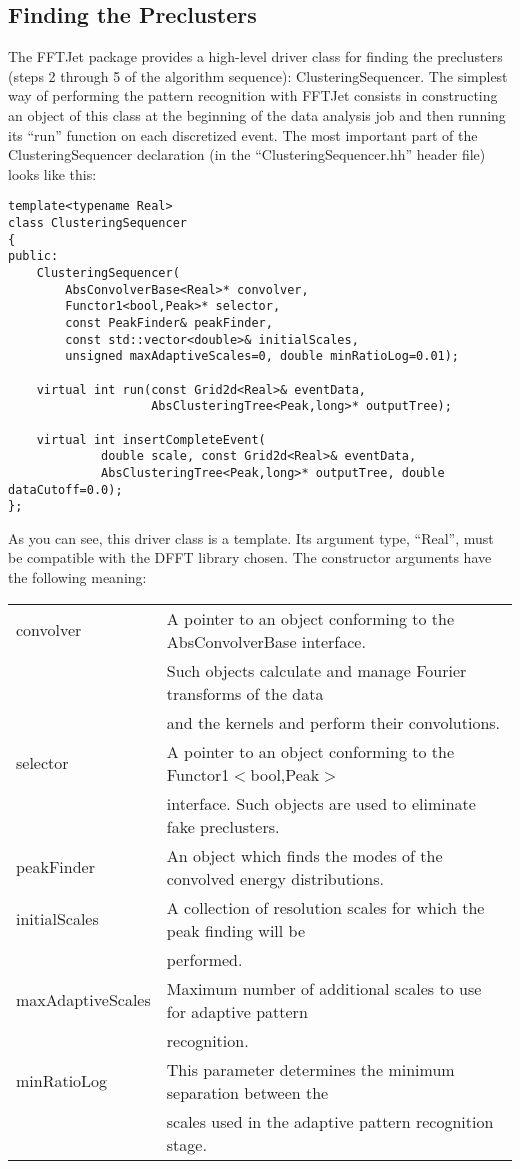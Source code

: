 \documentclass[epsf,12pt,titlepage]{article}
\newcommand{\cname}[1]{\index{#1}\textsf{#1}}
\begin{document}
\subsection{Finding the Preclusters}

The FFTJet package provides a high-level driver class
for finding the preclusters (steps 2 through 5 of the algorithm
sequence): \cname{ClusteringSequencer}.
The simplest way of performing the pattern recognition with
FFTJet consists in constructing an object of this class
at the beginning of the data analysis job and then running
its ``run'' function on each discretized event.
The most important part of the \cname{ClusteringSequencer} declaration
(in the ``ClusteringSequencer.hh'' header file) looks like this:
\begin{verbatim}
template<typename Real>
class ClusteringSequencer
{
public:
    ClusteringSequencer(
        AbsConvolverBase<Real>* convolver,
        Functor1<bool,Peak>* selector,
        const PeakFinder& peakFinder,
        const std::vector<double>& initialScales,
        unsigned maxAdaptiveScales=0, double minRatioLog=0.01);

    virtual int run(const Grid2d<Real>& eventData,
                    AbsClusteringTree<Peak,long>* outputTree);

    virtual int insertCompleteEvent(
             double scale, const Grid2d<Real>& eventData,
             AbsClusteringTree<Peak,long>* outputTree, double dataCutoff=0.0);
};
\end{verbatim}
As you can see, this driver class is a template. Its argument
type, ``Real'', must be compatible with the
DFFT library chosen. The constructor arguments have the
following meaning:
\vskip2mm

\noindent \begin{tabular}{ll}
convolver & A pointer to an object conforming to the \cname{AbsConvolverBase} interface.\\
& Such objects calculate and manage Fourier transforms of the data \\
& and the kernels and perform their convolutions.\\
selector & A pointer to an object conforming to the 
\cname{Functor1}$<$bool,Peak$>$  \\
& interface. Such objects are used to eliminate fake preclusters.\\
peakFinder & An object which finds the modes of the convolved energy distributions.\\
initialScales & A collection of resolution scales for which the peak finding will be \\
& performed.\\
maxAdaptiveScales & Maximum number of additional scales to use for adaptive pattern \\
& recognition.\\
minRatioLog & This parameter determines the minimum separation between the \\
& scales used in the adaptive pattern recognition stage.
\end{tabular}
\end{document}
